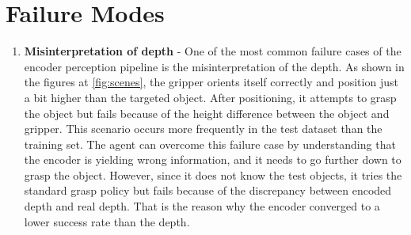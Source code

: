 \section{Failure Modes \label{sec:fail}}


\begin{enumerate}
    \item \textbf{Misinterpretation of depth} - One of the most common failure cases of the encoder perception pipeline is the misinterpretation of the depth. As shown in the figures at 
    \ref{fig:scenes}, the gripper orients itself correctly and position just a bit higher than the targeted object. After positioning, it attempts to grasp the object but fails because of the height difference between the object and gripper. This scenario occurs more frequently in the test dataset than the training set. The agent can overcome this failure case by understanding that the encoder is yielding wrong information, and it needs to go further down to grasp the object. However, since it does not know the test objects, it tries the standard grasp policy but fails because of the discrepancy between encoded depth and real depth. That is the reason why the encoder converged to a lower success rate than the depth.
        \begin{figure}[!htbp]
            \begin{subfigure}{0.49\textwidth}

\end{subfigure}
\end{figure}
\end{enumerate}
